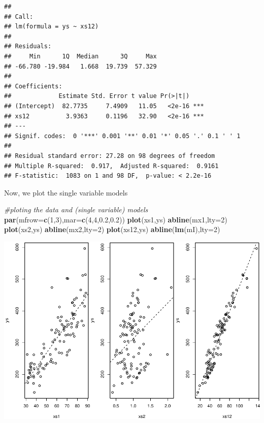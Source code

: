 \documentclass[
]{book}
\newenvironment{Shaded}{\begin{snugshade}}{\end{snugshade}}
\newcommand{\CommentTok}[1]{\textcolor[rgb]{0.56,0.35,0.01}{\textit{#1}}}
\newcommand{\DataTypeTok}[1]{\textcolor[rgb]{0.13,0.29,0.53}{#1}}
\newcommand{\DecValTok}[1]{\textcolor[rgb]{0.00,0.00,0.81}{#1}}
\newcommand{\FloatTok}[1]{\textcolor[rgb]{0.00,0.00,0.81}{#1}}
\newcommand{\KeywordTok}[1]{\textcolor[rgb]{0.13,0.29,0.53}{\textbf{#1}}}
\newcommand{\NormalTok}[1]{#1}
\begin{document}
\begin{verbatim}
## 
## Call:
## lm(formula = ys ~ xs12)
## 
## Residuals:
##     Min      1Q  Median      3Q     Max 
## -66.780 -19.984   1.668  19.739  57.329 
## 
## Coefficients:
##             Estimate Std. Error t value Pr(>|t|)    
## (Intercept)  82.7735     7.4909   11.05   <2e-16 ***
## xs12          3.9363     0.1196   32.90   <2e-16 ***
## ---
## Signif. codes:  0 '***' 0.001 '**' 0.01 '*' 0.05 '.' 0.1 ' ' 1
## 
## Residual standard error: 27.28 on 98 degrees of freedom
## Multiple R-squared:  0.917,	Adjusted R-squared:  0.9161 
## F-statistic:  1083 on 1 and 98 DF,  p-value: < 2.2e-16
\end{verbatim}

Now, we plot the single variable models

\begin{Shaded}
\begin{Highlighting}[]
\CommentTok{#ploting the data and (single variable) models}
\KeywordTok{par}\NormalTok{(}\DataTypeTok{mfrow=}\KeywordTok{c}\NormalTok{(}\DecValTok{1}\NormalTok{,}\DecValTok{3}\NormalTok{),}\DataTypeTok{mar=}\KeywordTok{c}\NormalTok{(}\DecValTok{4}\NormalTok{,}\DecValTok{4}\NormalTok{,}\FloatTok{0.2}\NormalTok{,}\FloatTok{0.2}\NormalTok{))}
\KeywordTok{plot}\NormalTok{(xs1,ys)}
\KeywordTok{abline}\NormalTok{(mx1,}\DataTypeTok{lty=}\DecValTok{2}\NormalTok{)}
\KeywordTok{plot}\NormalTok{(xs2,ys)}
\KeywordTok{abline}\NormalTok{(mx2,}\DataTypeTok{lty=}\DecValTok{2}\NormalTok{)}
\KeywordTok{plot}\NormalTok{(xs12,ys)}
\KeywordTok{abline}\NormalTok{(}\KeywordTok{lm}\NormalTok{(mI),}\DataTypeTok{lty=}\DecValTok{2}\NormalTok{)}
\end{Highlighting}
\end{Shaded}

\includegraphics{ECOMODbook_files/figure-latex/a12.5-1.pdf}
\end{document}
